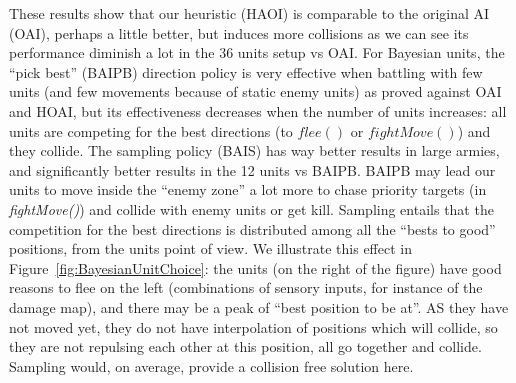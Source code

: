 These results show that our heuristic (HAOI) is comparable to the original AI (OAI), perhaps a little better, but induces more collisions as we can see its performance diminish a lot in the 36 units setup vs OAI. For Bayesian units, the ``pick best'' (BAIPB) direction policy is very effective when battling with few units (and few movements because of static enemy units) as proved against OAI and HOAI, but its effectiveness decreases when the number of units increases: all units are competing for the best directions (to $flee()$ or $fightMove()$) and they collide. The sampling policy (BAIS) has way better results in large armies, and significantly better results in the 12 units vs BAIPB. BAIPB may lead our units to move inside the ``enemy zone'' a lot more to chase priority targets (in \textit{fightMove()}) and collide with enemy units or get kill. Sampling entails that the competition for the best directions is distributed among all the ``bests to good'' positions, from the units point of view. We illustrate this effect in Figure~\ref{fig:BayesianUnitChoice}: the units (on the right of the figure) have good reasons to flee on the left (combinations of sensory inputs, for instance of the damage map), and there may be a peak of ``best position to be at''. AS they have not moved yet, they do not have interpolation of positions which will collide, so they are not repulsing each other at this position, all go together and collide. Sampling would, on average, provide a collision free solution here.
